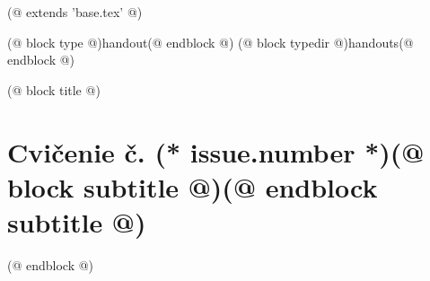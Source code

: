 (@ extends 'base.tex' @)

(@ block type @)handout(@ endblock @)
(@ block typedir @)handouts(@ endblock @)

(@ block title @)
    \section{Cvičenie č. (* issue.number *)(@ block subtitle @)(@ endblock subtitle @)}
(@ endblock @)
